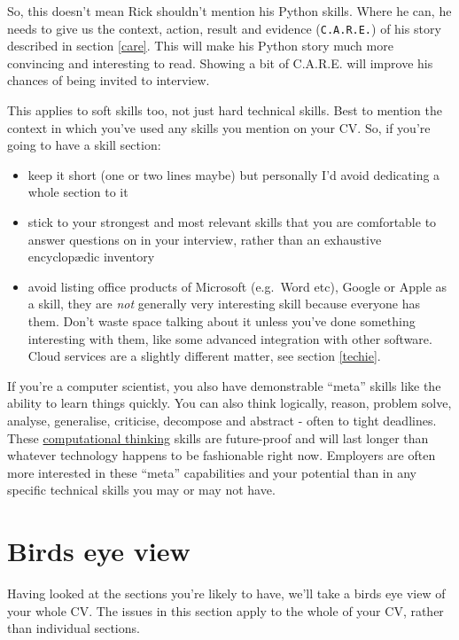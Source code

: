 \documentclass[
]{book}
\providecommand{\tightlist}{%
  \setlength{\itemsep}{0pt}\setlength{\parskip}{0pt}}
\begin{document}
So, this doesn't mean Rick shouldn't mention his Python skills. Where he can, he needs to give us the context, action, result and evidence (\texttt{C.A.R.E.}) of his story described in section \ref{care}. This will make his Python story much more convincing and interesting to read. Showing a bit of C.A.R.E. will improve his chances of being invited to interview.

This applies to soft skills too, not just hard technical skills. Best to mention the context in which you've used any skills you mention on your CV. So, if you're going to have a skill section:

\begin{itemize}
\tightlist
\item
  keep it short (one or two lines maybe) but personally I'd avoid dedicating a whole section to it
\item
  stick to your strongest and most relevant skills that you are comfortable to answer questions on in your interview, rather than an exhaustive encyclopædic inventory
\item
  avoid listing office products of Microsoft (e.g.~Word etc), Google or Apple as a skill, they are \emph{not} generally very interesting skill because everyone has them. Don't waste space talking about it unless you've done something interesting with them, like some advanced integration with other software. Cloud services are a slightly different matter, see section \ref{techie}.
\end{itemize}

If you're a computer scientist, you also have demonstrable ``meta'' skills like the ability to learn things quickly. You can also think logically, reason, problem solve, analyse, generalise, criticise, decompose and abstract - often to tight deadlines. These \href{https://en.wikipedia.org/wiki/Computational_thinking}{computational thinking} skills are future-proof and will last longer than whatever technology happens to be fashionable right now. Employers are often more interested in these ``meta'' capabilities and your potential than in any specific technical skills you may or may not have.

\hypertarget{birds-eye-view}{%
\section{Birds eye view}\label{birds-eye-view}}

Having looked at the sections you're likely to have, we'll take a birds eye view of your whole CV. The issues in this section apply to the whole of your CV, rather than individual sections.
\end{document}
